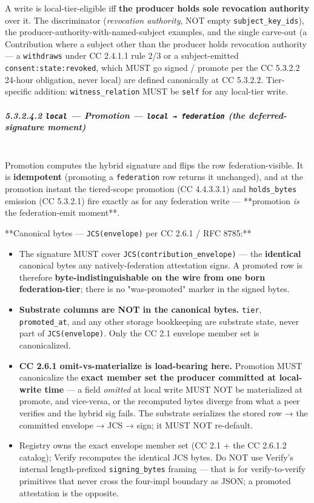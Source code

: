 \documentclass[11pt]{article}
\begin{document}
A write is local-tier-eligible iff \textbf{the producer holds sole revocation authority} over it. The discriminator (\textit{revocation authority}, NOT empty \texttt{subject\_key\_ids}), the producer-authority-with-named-subject examples, and the single carve-out (a Contribution where a subject other than the producer holds revocation authority — a \texttt{withdraws} under CC 2.4.1.1 rule 2/3 or a subject-emitted \texttt{consent:state:revoked}, which MUST go signed / promote per the CC 5.3.2.2 24-hour obligation, never local) are defined canonically at CC 5.3.2.2. Tier-specific addition: \texttt{witness\_relation} MUST be \texttt{self} for any local-tier write.


\subparagraph{5.3.2.4.2 \texttt{local} — Promotion — \texttt{local → federation} (the deferred-signature moment)}\mbox{}\\


Promotion computes the hybrid signature and flips the row federation-visible. It is \textbf{idempotent} (promoting a \texttt{federation} row returns it unchanged), and at the promotion instant the tiered-scope promotion (CC 4.4.3.3.1) and \texttt{holds\_bytes} emission (CC 5.3.2.1) fire exactly as for any federation write — **promotion \textit{is} the federation-emit moment**.


**Canonical bytes — \texttt{JCS(envelope)} per CC 2.6.1 / RFC 8785:**

\begin{itemize}\setlength\itemsep{0pt}
\item The signature MUST cover \texttt{JCS(contribution\_envelope)} — the \textbf{identical} canonical bytes any natively-federation attestation signs. A promoted row is therefore \textbf{byte-indistinguishable on the wire from one born federation-tier}; there is no "was-promoted" marker in the signed bytes.
\item \textbf{Substrate columns are NOT in the canonical bytes.} \texttt{tier}, \texttt{promoted\_at}, and any other storage bookkeeping are substrate state, never part of \texttt{JCS(envelope)}. Only the CC 2.1 envelope member set is canonicalized.
\item \textbf{CC 2.6.1 omit-vs-materialize is load-bearing here.} Promotion MUST canonicalize the \textbf{exact member set the producer committed at local-write time} — a field \textit{omitted} at local write MUST NOT be materialized at promote, and vice-versa, or the recomputed bytes diverge from what a peer verifies and the hybrid sig fails. The substrate serializes the stored row → the committed envelope → JCS → sign; it MUST NOT re-default.
\item Registry owns the exact envelope member set (CC 2.1 + the CC 2.6.1.2 catalog); Verify recomputes the identical JCS bytes. Do NOT use Verify's internal length-prefixed \texttt{signing\_bytes} framing — that is for verify-to-verify primitives that never cross the four-impl boundary as JSON; a promoted attestation is the opposite.
\end{itemize}
\end{document}
